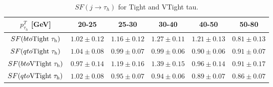 \begin{table}[h]
    \setlength{\tabcolsep}{6pt} %
    \renewcommand{\arraystretch}{1.5} %
    \caption{ $SF (j\to \tau_h)$ for Tight and VTight tau.}
    
    \begin{tabular}{c|ccccc}
    \hline
    $p^T_{\tau_h}$ [GeV]  & 20-25         & 25-30         & 30-40         & 40-50         & 50-80         \\
    \hline
    $SF(b\to \rm{Tight} \; \tau_h)$  & $1.02\pm0.12$ & $1.16\pm0.12$ & $1.27\pm0.11$ & $1.21\pm0.13$ & $0.81\pm0.13$ \\
    $SF(q\to \rm{Tight} \;  \tau_h)$  & $1.04\pm0.08$ & $0.99\pm0.07$ & $0.99\pm0.06$ & $0.90\pm0.06$ & $0.91\pm0.07$ \\
    \hline
    $SF(b\to \rm{VTight} \; \tau_h)$ & $0.97\pm0.14$ & $1.19\pm0.16$ & $1.39\pm0.15$ & $0.96\pm0.14$ & $0.91\pm0.17$ \\
    $SF(q\to \rm{VTight} \; \tau_h)$ & $1.02\pm0.08$ & $0.95\pm0.07$ & $0.94\pm0.06$ & $0.89\pm0.07$ & $0.86\pm0.07$ \\
    \hline
    \end{tabular}
 
    \label{tab:appendix:fakeTauId:fit}
\end{table}


\FloatBarrier